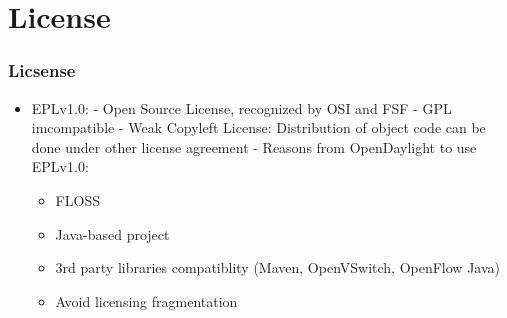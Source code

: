\section{License}

\begin{frame}
\frametitle{Licsense}

\begin{itemize}
 \item EPLv1.0:\linebreak
 - Open Source License, recognized by OSI and FSF\linebreak
 - GPL imcompatible\linebreak
 - Weak Copyleft License: Distribution of object code can be done under other license agreement\linebreak
 - Reasons from OpenDaylight to use EPLv1.0:
 \begin{itemize}
   \item FLOSS
   \item Java-based project
   \item 3rd party libraries compatiblity (Maven, OpenVSwitch, OpenFlow Java)
   \item Avoid licensing fragmentation
 \end{itemize}
\end{itemize}

\end{frame}
